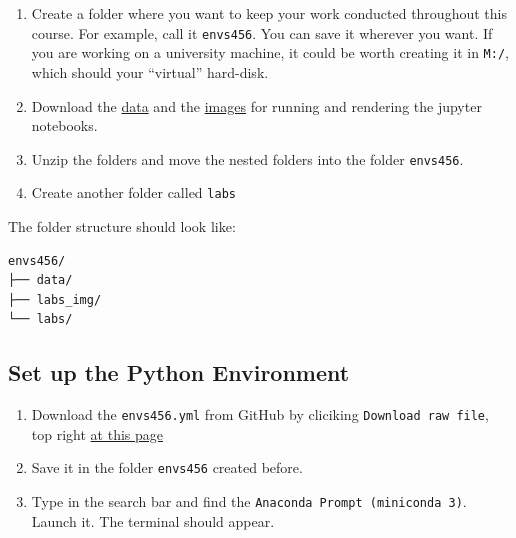 \documentclass[
  letterpaper,
  DIV=11,
  numbers=noendperiod]{scrreprt}
\providecommand{\tightlist}{%
  \setlength{\itemsep}{0pt}\setlength{\parskip}{0pt}}\usepackage{longtable,booktabs,array}
\begin{document}
\begin{enumerate}
\def\labelenumi{\arabic{enumi}.}
\tightlist
\item
  Create a folder where you want to keep your work conducted throughout
  this course. For example, call it \texttt{envs456}. You can save it
  wherever you want. If you are working on a university machine, it
  could be worth creating it in \texttt{M:/}, which should your
  ``virtual'' hard-disk.
\item
  Download the
  \href{https://minhaskamal.github.io/DownGit/\#/home?url=https://github.com/GDSL-UL/wma/tree/main/data}{data}
  and the
  \href{https://minhaskamal.github.io/DownGit/\#/home?url=https://github.com/GDSL-UL/wma/tree/main/labs_img}{images}
  for running and rendering the jupyter notebooks.
\item
  Unzip the folders and move the nested folders into the folder
  \texttt{envs456}.
\item
  Create another folder called \texttt{labs}
\end{enumerate}

The folder structure should look like:

\begin{verbatim}
envs456/
├── data/
├── labs_img/
└── labs/
\end{verbatim}

\subsection*{Set up the Python
Environment}\label{set-up-the-python-environment}

\begin{enumerate}
\def\labelenumi{\arabic{enumi}.}
\tightlist
\item
  Download the \texttt{envs456.yml} from GitHub by cliciking
  \texttt{Download\ raw\ file}, top right
  \href{https://github.com/GDSL-UL/wma/blob/main/envs456.yml}{at this
  page}
\item
  Save it in the folder \texttt{envs456} created before.
\item
  Type in the search bar and find the
  \texttt{Anaconda\ Prompt\ (miniconda\ 3)}. Launch it. The terminal
  should appear.
\end{enumerate}
\end{document}
